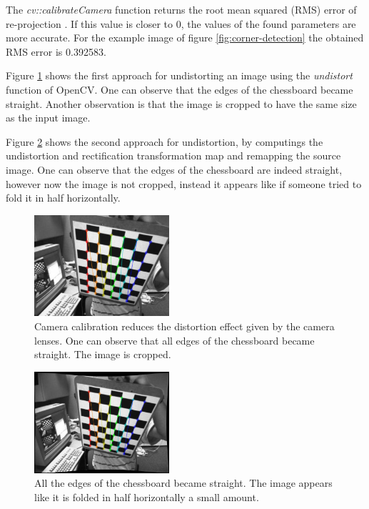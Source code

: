 \documentclass[conference]{IEEEtran}
\begin{document}
The \emph{cv::calibrateCamera} function returns the root mean squared (RMS) error of re-projection \cite{2020opencv}. If this value is closer to 0, the values of the found parameters are more accurate. For the example image of figure \ref{fig:corner-detection} the obtained RMS error is 0.392583.

Figure \ref{fig:camera-calibration} shows the first approach for undistorting an image using the \emph{undistort} function of OpenCV. One can observe that the edges of the chessboard became straight. Another observation is that the image is cropped to have the same size as the input image.

Figure \ref{fig:camera-calibration2} shows the second approach for undistortion, by computings the undistortion and rectification transformation map and remapping the source image. One can observe that the edges of the chessboard are indeed straight, however now the image is not cropped, instead it appears like if someone tried to fold it in half horizontally.

\begin{figure}[bt] 
    \centering
    \includegraphics[width=5cm]{Figures/camera-calibration.png}
    \caption{Camera calibration reduces the distortion effect given by the camera lenses. One can observe that all edges of the chessboard became straight. The image is cropped.}
    \label{fig:camera-calibration}
\end{figure}

\begin{figure}[bt] 
    \centering
    \includegraphics[width=5cm]{Figures/camera-calibration2.png}
    \caption{All the edges of the chessboard became straight. The image appears like it is folded in half horizontally a small amount.}
    \label{fig:camera-calibration2}
\end{figure}
\end{document}
